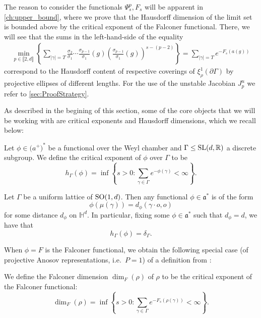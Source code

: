 \documentclass{report}
\begin{document}
\begin{remark}
    The reason to consider the functionals $\Psi_s^p, F_s$ will be apparent in \cref{ch:upper_bound}, where we prove that the Hausdorff dimension of the limit set is bounded above by the critical exponent of the Falconer functional.
    There, we will see that the sums in the left-hand-side of the equality
\begin{align*}
    \min_{p \in \llbracket 2, d \rrbracket} 
    \left\{ 
        \sum_{|\gamma| = T} 
            \frac{\sigma_2}{\sigma_1}\cdots\frac{\sigma_{p-1}}{\sigma_1}(g) 
            \left( \frac{\sigma_{p-1}}{\sigma_1}(g) \right)^{s - (p-2)}
    \right\} = 
    \sum_{|\gamma| = T} e^{-F_s(a(g))}
\end{align*}
correspond to the Hausdorff content of respective coverings of $\xi_\rho^1(\partial \Gamma)$ by projective ellipses of different lengths.
For the use of the unstable Jacobian $J_p^u$ we refer to \cref{sec:ProofStrategy}.
\end{remark}

As described in the begining of this section, some of the core objects that we will be working with are critical exponents and Hausdorff dimensions, which we recall below:
\begin{definition}
    \label{def:functional_critical_exponent}
Let $\phi \in \mathfrak (a^+)^*$ be a functional over the Weyl chamber and $\Gamma \leq \operatorname{{\mathrm{SL}}}(d, \mathbb R)$ a discrete subgroup.
We define the critical exponent of $\phi$ over $\Gamma$ to be
\[
    h_\Gamma(\phi) = \inf
    \left\{
        s > 0: \sum_{\gamma \in \Gamma} e^{-\phi(\gamma)} < \infty
    \right\}.
\]    
\end{definition}

\begin{example}
    \label{ex:critical_exponent}
    Let $\Gamma$ be a uniform lattice of $\operatorname{{\mathrm{SO}}}(1, d)$.
    Then any functional $\phi \in \mathfrak a^*$ is of the form
    \[
        \phi(\mu(\gamma)) = d_\phi(\gamma \cdot o, o) 
    \]
    for some distance $d_\phi$ on $\mathbb H^d$.
    In particular, fixing some $\phi \in \mathfrak a^*$ such that $d_\phi = d$, we have that
    \[
    h_\Gamma(\phi) = \delta_\Gamma.
    \] 
\end{example}

When $\phi = F$ is the Falconer functional, we obtain the following special case (of projective Anosov representations, i.e.\ $P = {1}$) of a definition from \cite{ledrappier_dimension_2023}:
\begin{definition}
    We define the Falconer dimension $\dim_F(\rho)$ of $\rho$ to be the critical exponent of the Falconer functional:
    \[
        \dim_F(\rho) = \inf
        \left\{
            s > 0: \sum_{\gamma \in \Gamma} e^{-F_s(\rho(\gamma))} < \infty
        \right\}.
    \]
\end{definition}
\end{document}
